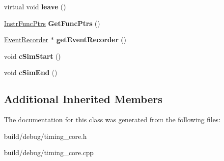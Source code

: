 \begin{DoxyCompactItemize}
\item 
\hypertarget{classTimingCore_a9d7cc978eef35631372f8499eaf75b69}{virtual void {\bfseries leave} ()}\label{classTimingCore_a9d7cc978eef35631372f8499eaf75b69}

\item 
\hypertarget{classTimingCore_a6be334bfbad52433841c5ebbdf6c74d5}{\hyperlink{structInstrFuncPtrs}{Instr\-Func\-Ptrs} {\bfseries Get\-Func\-Ptrs} ()}\label{classTimingCore_a6be334bfbad52433841c5ebbdf6c74d5}

\item 
\hypertarget{classTimingCore_af5ed643b8753ec8d17a85a9c20b75862}{\hyperlink{classEventRecorder}{Event\-Recorder} $\ast$ {\bfseries get\-Event\-Recorder} ()}\label{classTimingCore_af5ed643b8753ec8d17a85a9c20b75862}

\item 
\hypertarget{classTimingCore_a8bcea2d841226aaeb8106216572e6fa3}{void {\bfseries c\-Sim\-Start} ()}\label{classTimingCore_a8bcea2d841226aaeb8106216572e6fa3}

\item 
\hypertarget{classTimingCore_a0c85a00303cba302d71ea828a47c3822}{void {\bfseries c\-Sim\-End} ()}\label{classTimingCore_a0c85a00303cba302d71ea828a47c3822}

\end{DoxyCompactItemize}
\subsection*{Additional Inherited Members}


The documentation for this class was generated from the following files\-:\begin{DoxyCompactItemize}
\item 
build/debug/timing\-\_\-core.\-h\item 
build/debug/timing\-\_\-core.\-cpp\end{DoxyCompactItemize}
